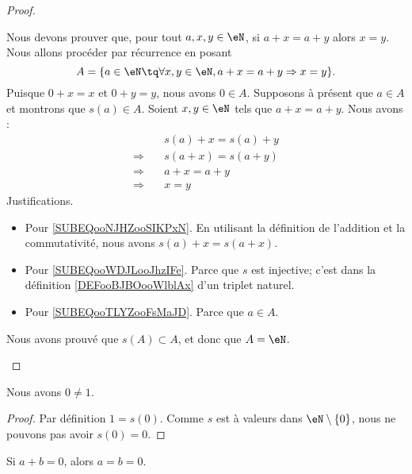 \begin{proof}
\begin{subproof}
        Nous devons prouver que, pour tout \( a,x,y\in \eN\), si \( a+x=a+y\) alors \( x=y\). Nous allons procéder par récurrence en posant
        \begin{equation}
            A=\{ a\in \eN\tq\forall x,y\in \eN, a+x=a+y\Rightarrow x=y\}.
        \end{equation}
        Puisque \( 0+x=x\) et \( 0+y=y\), nous avons \( 0\in A\). Supposons à présent que \( a\in A\) et montrons que \( s(a)\in A\). Soient \( x,y\in \eN\) tels que \( a+x=a+y\). Nous avons :
        \begin{subequations}
            \begin{align}
                &\quad s(a)+x=s(a)+y\\
                \Rightarrow &\quad s(a+x)=s(a+y)     \label{SUBEQooNJHZooSIKPxN}\\
                \Rightarrow &\quad a+x=a+y          \label{SUBEQooWDJLooJhzIFe}\\
                \Rightarrow &\quad x=y          \label{SUBEQooTLYZooFsMaJD}
            \end{align}
        \end{subequations}
        Justifications.
        \begin{itemize}
            \item Pour \eqref{SUBEQooNJHZooSIKPxN}. En utilisant la définition de l'addition et la commutativité, nous avons \( s(a)+x=s(a+x)\).
            \item Pour \eqref{SUBEQooWDJLooJhzIFe}. Parce que \( s\) est injective; c'est dans la définition \ref{DEFooBJBOooWlblAx} d'un triplet naturel.
            \item Pour \eqref{SUBEQooTLYZooFsMaJD}. Parce que \( a\in A\).
        \end{itemize}
        Nous avons prouvé que \( s(A)\subset A\), et donc que \( A=\eN\).
    \end{subproof}
\end{proof}

\begin{lemma}       \label{LEMooCOMSooEWrumL}
    Nous avons \( 0\neq 1\).
\end{lemma}

\begin{proof}
    Par définition \( 1=s(0)\). Comme \( s\) est à valeurs dans \( \eN\setminus\{ 0 \}\), nous ne pouvons pas avoir \( s(0)=0\).
\end{proof}

\begin{lemma}       \label{LEMooQBHFooCuCusQ}
    Si \( a+b=0\), alors \( a=b=0\).
\end{lemma}


